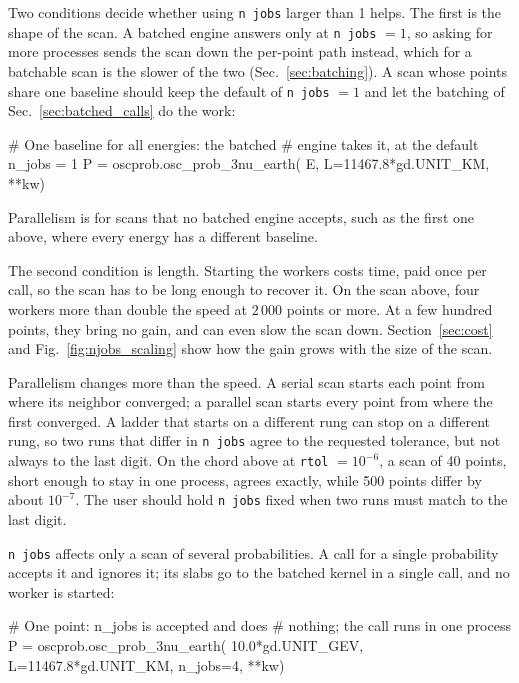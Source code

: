 \documentclass[final,5p,times,twocolumn,sort,compress]{elsarticle}
\makeatletter
\newcommand{\fig}{Fig.}
\DeclareRobustCommand{\_}{%
  \ifmmode\nfss@text{\textunderscore}\else\textunderscore\allowbreak\fi}
\newcommand{\figu}[1]{\fig~\ref{fig:#1}}
\makeatother
\begin{document}
Two conditions decide whether using {\tt n\_jobs} larger than 1 helps. The first is the shape of the scan. A batched engine answers only at {\tt n\_jobs} $= 1$, so asking for more processes sends the scan down the per-point path instead, which for a batchable scan is the slower of the two (Sec.~\ref{sec:batching}). A scan whose points share one baseline should keep the default of {\tt n\_jobs} $= 1$ and let the batching of Sec.~\ref{sec:batched_calls} do the work:
\begin{pysnip}
# One baseline for all energies: the batched
# engine takes it, at the default n_jobs = 1
P = oscprob.osc_prob_3nu_earth(
    E, L=11467.8*gd.UNIT_KM, **kw)
\end{pysnip}
Parallelism is for scans that no batched engine accepts, such as the first one above, where every energy has a different baseline.

The second condition is length. Starting the workers costs time, paid once per call, so the scan has to be long enough to recover it. On the scan above, four workers more than double the speed at $2\,000$ points or more. At a few hundred points, they bring no gain, and can even slow the scan down. Section~\ref{sec:cost} and \figu{njobs_scaling} show how the gain grows with the size of the scan.

Parallelism changes more than the speed. A serial scan starts each point from where its neighbor converged; a parallel scan starts every point from where the first converged. A ladder that starts on a different rung can stop on a different rung, so two runs that differ in {\tt n\_jobs} agree to the requested tolerance, but not always to the last digit. On the chord above at {\tt rtol} $= 10^{-6}$, a scan of 40 points, short enough to stay in one process, agrees exactly, while 500 points differ by about $10^{-7}$. The user should hold {\tt n\_jobs} fixed when two runs must match to the last digit.

{\tt n\_jobs} affects only a scan of several probabilities. A call for a single probability accepts it and ignores it; its slabs go to the batched kernel in a single call, and no worker is started:
\begin{pysnip}
# One point: n_jobs is accepted and does
# nothing; the call runs in one process
P = oscprob.osc_prob_3nu_earth(
    10.0*gd.UNIT_GEV, L=11467.8*gd.UNIT_KM,
    n_jobs=4, **kw)
\end{pysnip}

\end{document}
